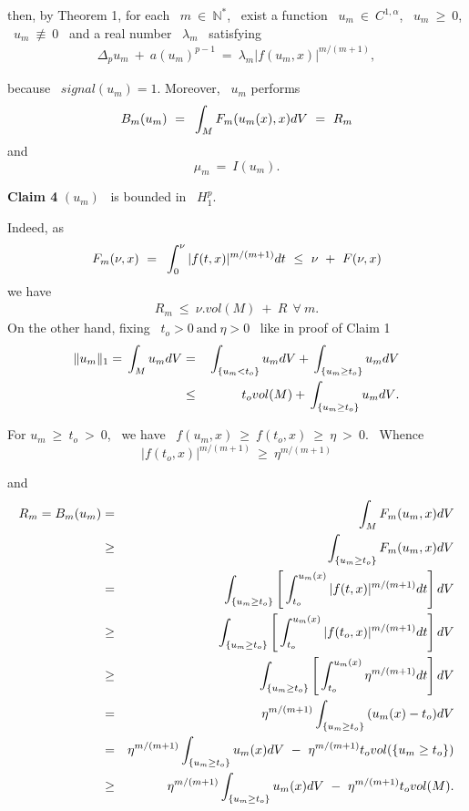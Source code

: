 \documentclass[12pt]{article}
\begin{document}
\noindent  then, by Theorem 1, for each \ $m \ \in \ \mathbb{N}^{\ast}$,
 \ exist a function \ $u_m \ \in \ C^{1,\alpha}$, \ $u_m \ \geq \ 0$, \ $u_m \ \not\equiv \ 0$ 
\ and a real number \ $\lambda_m$ \ satisfying 
\vspace{-0.5mm}
\begin{eqnarray}
\label{2.3}
\Delta_pu_m \ + \ a(u_m)^{p-1} \ = \ \lambda_m |f(u_m,x)|^{m/(m+1)}, 
\end{eqnarray}

\noindent  because \ $signal(u_m) = 1.$ Moreover, \ $u_m$ performs
$$B_m(u_m) \ = \ {\displaystyle}\int_M{F_m(u_m(x),x)dV} \ = \ R_m$$
\noindent  and
$$\mu_m \ = \ I(u_m).$$

{\bf Claim 4}
$(u_m)$ \ is bounded in \ $H^p_1$.

Indeed, as
$$F_m(\nu,x) \ = \ {\displaystyle}\int_0^{\nu}{|f(t,x)|^{m/(m+1)}dt} \ \leq \ \nu \ + \ F(\nu,x)$$
we have
\begin{eqnarray}
\label{2.4}
R_m \ \leq \ \nu .vol(M) \ + \ R  \ \ \forall \ m. 
\end{eqnarray}
On the other hand, fixing \ $t_o > 0 \ \mbox{and} \ \eta > 0$ \ like in proof of Claim 1
\vspace{-0.5mm}
\begin{eqnarray*}
\|u_m\|_1 = {\displaystyle}\int_M{u_m dV} & = & {\displaystyle}\int_{\{u_m < t_o\}}{u_m dV} + {\displaystyle}\int_{\{u_m \geq t_o\}}{u_m dV} \\
   & \leq & t_o vol(M) + {\displaystyle}\int_{\{u_m \geq t_o\}}{u_m dV}.
\end{eqnarray*}   

\noindent  For $u_m \ \geq \ t_o \ > \ 0$, \ we have \ $f(u_m,x)\ \geq \ f(t_o,x) \ \geq \ \eta \ > \ 0$. \ Whence 
$$|f(t_o,x)|^{m/(m + 1)} \ \geq \ \eta^{m/(m + 1)}$$

\noindent  and 
\begin{eqnarray*}
R_m = B_m(u_m) & = & {\displaystyle}\int_M{F_m(u_m,x)dV} \\
  & \geq & {\displaystyle}\int_{\{u_m \geq t_o \}}{F_m(u_m,x)dV} \\
  & = & {\displaystyle}\int_{\{u_m \geq t_o \}}{\left[{\displaystyle}\int_{t_o}^{u_m(x)}{|f(t,x)|^{m/(m + 1)}dt}\right]dV} \\ 
  & \geq & {\displaystyle}\int_{\{u_m \geq t_o \}}{\left[{\displaystyle}\int_{t_o}^{u_m(x)}{|f(t_o,x)|^{m/(m + 1)}dt}\right]dV} \\
  & \geq & {\displaystyle}\int_{\{u_m \geq t_o \}}{\left[{\displaystyle}\int_{t_o}^{u_m(x)}{\eta^{m/(m + 1)} dt}\right]dV} \\ 
  & = & \eta^{m/(m + 1)} {\displaystyle}\int_{\{u_m \geq t_o \}}{(u_m(x) - t_o)dV} \\
  & = & \eta^{m/(m + 1)} {\displaystyle}\int_{\{u_m \geq t_o \}}{u_m(x)dV} \ - \ \eta^{m/(m + 1)} t_o vol(\{u_m \geq t_o \}) \\
  & \geq & \eta^{m/(m + 1)} {\displaystyle}\int_{\{u_m \geq t_o \}}{u_m(x)dV} \ -\  \eta^{m/(m + 1)} t_o vol(M).
\end{eqnarray*}
\end{document}
